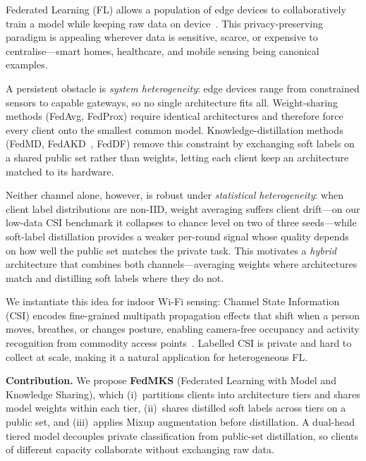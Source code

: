 \documentclass[conference]{IEEEtran}
\begin{document}
Federated Learning (FL) allows a population of edge devices to
collaboratively train a model while keeping raw data on
device~\cite{mcmahan2017fedavg}.  This privacy-preserving paradigm is
appealing wherever data is sensitive, scarce, or expensive to
centralise---smart homes, healthcare, and mobile sensing being canonical
examples.

A persistent obstacle is \emph{system heterogeneity}: edge devices range
from constrained sensors to capable gateways, so no single architecture
fits all.  Weight-sharing methods (FedAvg, FedProx) require identical
architectures and therefore force every client onto the smallest common
model.  Knowledge-distillation methods (FedMD, FedAKD~\cite{gad2023fedakd}, FedDF) remove this
constraint by exchanging soft labels on a shared public set rather than
weights, letting each client keep an architecture matched to its
hardware.

Neither channel alone, however, is robust under \emph{statistical
heterogeneity}: when client label distributions are non-IID, weight
averaging suffers client drift---on our low-data CSI benchmark it
collapses to chance level on two of three seeds---while soft-label
distillation provides a weaker per-round signal whose quality depends
on how well the public set matches the private task.  This motivates a \emph{hybrid}
architecture that combines both channels---averaging weights where
architectures match and distilling soft labels where they do not.

We instantiate this idea for indoor Wi-Fi sensing: Channel State
Information (CSI) encodes fine-grained multipath propagation effects that
shift when a person moves, breathes, or changes posture, enabling
camera-free occupancy and activity recognition from commodity access
points~\cite{ma2019survey, yousefi2017survey}.  Labelled CSI is private
and hard to collect at scale, making it a natural application for
heterogeneous FL.

\textbf{Contribution.}  We propose \textbf{FedMKS} (Federated Learning
with Model and Knowledge Sharing), which (i)~partitions clients into
architecture tiers and shares model weights within each tier,
(ii)~shares distilled soft labels across tiers on a public set, and
(iii)~applies Mixup augmentation before distillation.  A dual-head tiered
model decouples private classification from public-set distillation, so
clients of different capacity collaborate without exchanging raw data.
\end{document}
